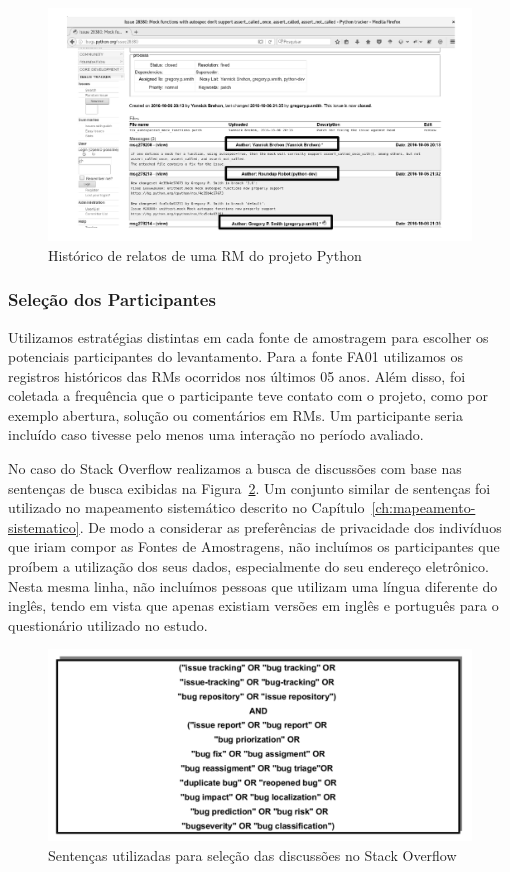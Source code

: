 \begin{figure}[htpb]
	\centering
	\includegraphics[width=0.7\linewidth]{./chapter-pesquisa-com-profissionais/img/historico-rm-python.pdf}
	\caption{Histórico de relatos de uma RM do projeto Python}\label{fig:historico-rm-python}
\end{figure}

\subsubsection{Seleção dos Participantes}\label{subsubsec:pesquisa_profissionais_plano_pesquisa}

Utilizamos estratégias distintas em cada fonte de amostragem para escolher os
potenciais participantes do levantamento. Para a fonte FA01 utilizamos os
registros históricos das RMs ocorridos nos últimos 05 anos. Além disso, foi
coletada a frequência que o participante teve contato com o projeto, como por
exemplo abertura, solução ou comentários em RMs. Um participante seria incluído
caso tivesse pelo menos uma interação no período avaliado.

No caso do Stack Overflow realizamos a busca de discussões com base nas
sentenças de busca exibidas na Figura~\ref{fig:setencas-grupos}. Um conjunto
similar de sentenças foi utilizado no mapeamento sistemático descrito no
Capítulo~\ref{ch:mapeamento-sistematico}. De modo a considerar as preferências
de privacidade dos indivíduos que iriam compor as Fontes de Amostragens, não
incluímos os participantes que proíbem a utilização dos seus dados,
especialmente do seu endereço eletrônico. Nesta mesma linha, não incluímos
pessoas que utilizam uma língua diferente do inglês, tendo em vista que apenas
existiam versões em inglês e português para o questionário utilizado no estudo.

\begin{figure}[htpb]
	\centering
	\includegraphics[width=0.7\linewidth]{./chapter-pesquisa-com-profissionais/img/setencas-grupos.pdf}
	\caption{Sentenças utilizadas para seleção das discussões no Stack Overflow}\label{fig:setencas-grupos}
\end{figure}

